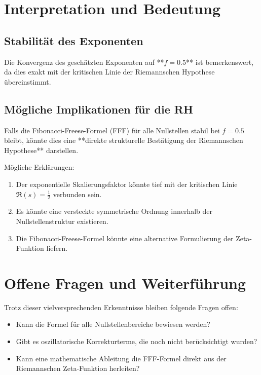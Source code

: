 \documentclass[a4paper,11pt]{article}
\begin{document}
\section{Interpretation und Bedeutung}

\subsection{Stabilität des Exponenten}

Die Konvergenz des geschätzten Exponenten auf **\( f = 0.5 \)** ist bemerkenswert, da dies exakt mit der kritischen Linie der Riemannschen Hypothese übereinstimmt.

\subsection{Mögliche Implikationen für die RH}

Falls die Fibonacci-Freese-Formel (FFF) für alle Nullstellen stabil bei \( f = 0.5 \) bleibt, könnte dies eine **direkte strukturelle Bestätigung der Riemannschen Hypothese** darstellen.

Mögliche Erklärungen:
\begin{enumerate}
    \item Der exponentielle Skalierungsfaktor könnte tief mit der kritischen Linie \( \Re(s) = \frac{1}{2} \) verbunden sein.
    \item Es könnte eine versteckte symmetrische Ordnung innerhalb der Nullstellenstruktur existieren.
    \item Die Fibonacci-Freese-Formel könnte eine alternative Formulierung der Zeta-Funktion liefern.
\end{enumerate}

\section{Offene Fragen und Weiterführung}

Trotz dieser vielversprechenden Erkenntnisse bleiben folgende Fragen offen:
\begin{itemize}
    \item Kann die Formel für alle Nullstellenbereiche bewiesen werden?
    \item Gibt es oszillatorische Korrekturterme, die noch nicht berücksichtigt wurden?
    \item Kann eine mathematische Ableitung die FFF-Formel direkt aus der Riemannschen Zeta-Funktion herleiten?
\end{itemize}
\end{document}

